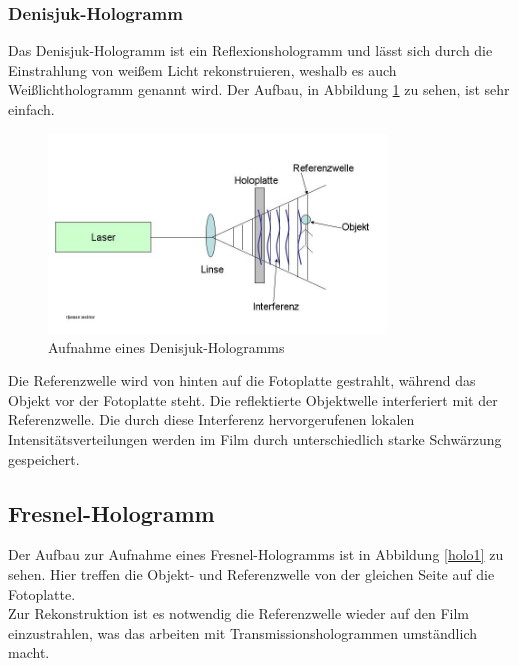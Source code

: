         \subsubsection*{Denisjuk-Hologramm}
Das Denisjuk-Hologramm ist ein Reflexionshologramm und lässt sich durch die
Einstrahlung von weißem Licht rekonstruieren, weshalb es auch Weißlichthologramm
genannt wird. Der Aufbau, in Abbildung \ref{holo2} zu sehen, ist sehr einfach.
\begin{figure}[H]
   \centering
   \includegraphics[width=0.8\textwidth]{Abb/denisjuk.jpg} 
   \caption{Aufnahme eines Denisjuk-Hologramms}
   \label{holo2}
\end{figure}
Die Referenzwelle wird von hinten auf die Fotoplatte gestrahlt, während das Objekt 
vor der Fotoplatte steht. Die reflektierte Objektwelle interferiert mit der
Referenzwelle. Die durch diese Interferenz hervorgerufenen lokalen 
Intensitätsverteilungen werden im Film durch unterschiedlich starke Schwärzung
gespeichert. \\

        \subsection*{Fresnel-Hologramm}
Der Aufbau zur Aufnahme eines Fresnel-Hologramms ist in Abbildung \ref{holo1}
zu sehen. Hier treffen die Objekt- und Referenzwelle von der gleichen Seite
auf die Fotoplatte.\\
Zur Rekonstruktion ist es notwendig die Referenzwelle wieder auf den Film
einzustrahlen, was das arbeiten mit Transmissionshologrammen umständlich macht.